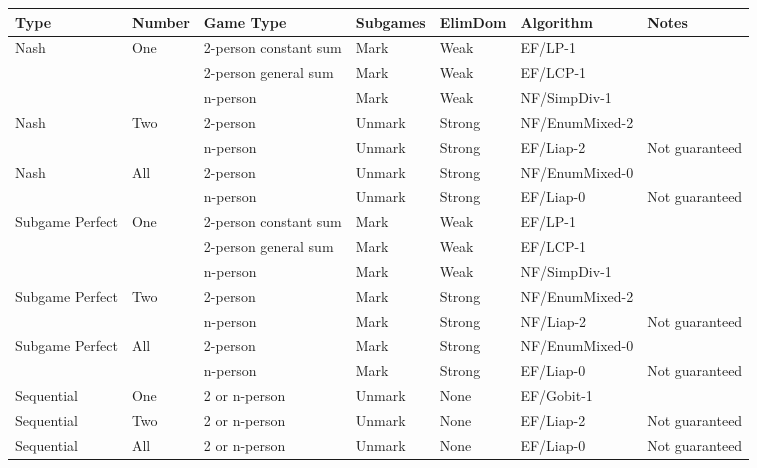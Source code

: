 \begin{tabular}{|p{2cm}|p{2cm}|p{3cm}|p{2cm}|p{2cm}|p{3cm}|l|}
Type & Number & Game Type & Subgames & ElimDom & Algorithm & Notes\\
\hline
Nash & One &  2-person constant sum&  Mark & Weak & EF/LP-1 &\\
     &     &  2-person general sum &  Mark & Weak & EF/LCP-1 &\\
     &     &  n-person             &  Mark & Weak & NF/SimpDiv-1 &\\
\hline
Nash & Two &  2-person             &  Unmark & Strong & NF/EnumMixed-2 &\\
     &     &  n-person             &  Unmark & Strong & EF/Liap-2 &Not guaranteed\\
\hline
Nash & All &  2-person             &  Unmark & Strong & NF/EnumMixed-0 &\\
     &     &  n-person             &  Unmark & Strong & EF/Liap-0 &Not guaranteed\\
\hline
Subgame Perfect & One &  2-person constant sum&  Mark & Weak & EF/LP-1 &\\
                &     &  2-person general sum &  Mark & Weak & EF/LCP-1 &\\
                &     &  n-person             &  Mark & Weak & NF/SimpDiv-1 &\\
\hline
Subgame Perfect & Two &  2-person             &  Mark & Strong & NF/EnumMixed-2 &\\
                &     &  n-person             &  Mark & Strong & NF/Liap-2 &Not guaranteed\\
\hline
Subgame Perfect & All &  2-person             &  Mark & Strong & NF/EnumMixed-0 &\\
                &     &  n-person             &  Mark & Strong & EF/Liap-0 &Not guaranteed\\
\hline
Sequential & One &  2 or n-person          &  Unmark & None & EF/Gobit-1 &\\
\hline
Sequential & Two &  2 or n-person          &  Unmark & None & EF/Liap-2 &Not guaranteed\\
\hline
Sequential & All &  2 or n-person          &  Unmark & None & EF/Liap-0 &Not guaranteed\\
\hline
\end{tabular}


\subsection{}

